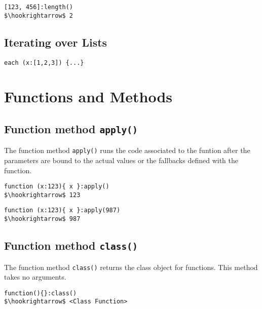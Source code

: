 \documentclass[11pt,a4paper]{scrbook}
\newcommand\method[1]{\texttt{#1}}
\begin{document}
\begin{lstlisting}[language=BibTool,mathescape=true]
[123, 456]:length()
$\hookrightarrow$ 2
\end{lstlisting}

\subsection{Iterating over Lists}


\begin{lstlisting}[language=BibTool,mathescape=true]
each (x:[1,2,3]) {...}
\end{lstlisting}


\section{Functions and Methods}



\subsection{Function method \method{apply()}}

The function method \method{apply()} runs the code associated to the funtion
after the parameters are bound to the actual values or the fallbacks defined
with the function.

\begin{lstlisting}[language=BibTool,mathescape=true]
function (x:123){ x }:apply()
$\hookrightarrow$ 123
\end{lstlisting}

\begin{lstlisting}[language=BibTool,mathescape=true]
function (x:123){ x }:apply(987)
$\hookrightarrow$ 987
\end{lstlisting}


\subsection{Function method \method{class()}}

The function method \method{class()} returns the class object for functions.
This method takes no arguments.

\begin{lstlisting}[language=BibTool,mathescape=true]
function(){}:class()
$\hookrightarrow$ <Class Function>
\end{lstlisting}
\end{document}
